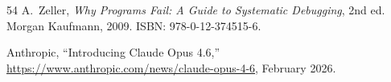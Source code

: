 \documentclass[acmlarge,nonacm,screen]{acmart}
\begin{document}
\begin{thebibliography}{54}
A.~Zeller,
\textit{Why Programs Fail: A Guide to Systematic Debugging}, 2nd ed.
Morgan Kaufmann, 2009. ISBN: 978-0-12-374515-6.

Anthropic,
``Introducing Claude Opus 4.6,''
\url{https://www.anthropic.com/news/claude-opus-4-6}, February 2026.

\end{thebibliography}
\end{document}
